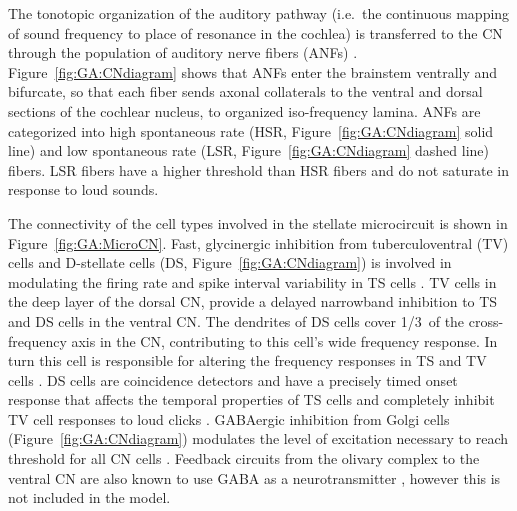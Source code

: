 \medskip{} 

The tonotopic organization of the auditory pathway (i.e.\ the
continuous mapping of sound frequency to place of resonance in the
cochlea) is transferred to the CN through the population of auditory
nerve fibers (ANFs)
\citep{Lorente:1981}. Figure~\ref{fig:GA:CNdiagram} shows that ANFs
enter the brainstem ventrally and bifurcate, so that each fiber sends
axonal collaterals to the ventral and dorsal sections of the cochlear
nucleus, to organized iso-frequency lamina. ANFs are categorized into
high spontaneous rate (HSR, Figure~\ref{fig:GA:CNdiagram} solid line)
and low spontaneous rate (LSR, Figure~\ref{fig:GA:CNdiagram} dashed
line) fibers. LSR fibers have a higher threshold than HSR fibers and
do not saturate in response to loud sounds.

\medskip{} 

The connectivity of the cell types involved in the stellate
microcircuit is shown in Figure~\ref{fig:GA:MicroCN}. Fast,
glycinergic inhibition from tuberculoventral (TV) cells and D-stellate
cells (DS, Figure~\ref{fig:GA:CNdiagram}) is involved in modulating
the firing rate and spike interval variability in TS cells
\citep{FerragamoGoldingEtAl:1998,WickesbergOertel:1993}. TV cells in
the deep layer of the dorsal CN, provide a delayed narrowband
inhibition to TS and DS cells in the ventral CN\@.  The dendrites of
DS cells cover 1/3~of the cross-frequency axis in the CN, contributing
to this cell's wide frequency response. In turn this cell is
responsible for altering the frequency responses in TS and TV cells
\citep{SpirouDavisEtAl:1999}. DS cells are coincidence detectors and
have a precisely timed onset response that affects the temporal
properties of TS cells
\citep{PaoliniClareyEtAl:2005,RhodeGreenberg:1994a} and completely
inhibit TV cell responses to loud clicks
\citep{SpirouDavisEtAl:1999}. GABAergic inhibition from Golgi cells
(Figure~\ref{fig:GA:CNdiagram}) modulates the level of excitation
necessary to reach threshold for all CN cells
\citep{CasparyBackoffEtAl:1994,FerragamoGoldingEtAl:1998}. Feedback
circuits from the olivary complex to the ventral CN are also known to
use GABA as a neurotransmitter \citep{SaintMorestEtAl:1989}, however
this is not included in the model.

\medskip{} 

